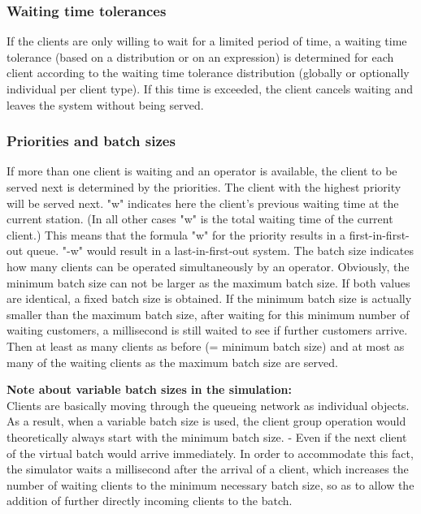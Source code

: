 \subsubsection*{Waiting time tolerances}

If the clients are only willing to wait for a limited period of time, a waiting time tolerance (based on a distribution
or on an expression) is determined for each client according to the waiting time tolerance distribution
(globally or optionally individual per client type). If this time is exceeded, the client cancels waiting and leaves
the system without being served.

\subsubsection*{Priorities and batch sizes}

If more than one client is waiting and an operator is available, the client to be served next is determined by the 
priorities. The client with the highest priority will be served next. 
"w" indicates here the client's previous waiting time at the current station. (In all other cases "w" is the total
waiting time of the current client.) This means that the formula "w" for the priority results
in a first-in-first-out queue. "-w" would result in a last-in-first-out system.
The batch size indicates how many clients can be operated simultaneously by an operator. Obviously, the minimum batch
size can not be larger as the maximum batch size. If both values are identical, a fixed batch size is obtained.
If the minimum batch size is actually smaller than the maximum batch size, after waiting for this minimum number of
waiting customers, a millisecond is still waited to see if further customers arrive. Then at least as many clients
as before (= minimum batch size) and at most as many of the waiting clients as the maximum batch size are served.

\textbf{Note about variable batch sizes in the simulation:}~\\
Clients are basically moving through the queueing network as individual objects.
As a result, when a variable batch size is used, the client group operation would theoretically always
start with the minimum batch size. - Even if the next client of the virtual batch would arrive immediately.
In order to accommodate this fact, the simulator waits a millisecond after the arrival of a client, which
increases the number of waiting clients to the minimum necessary batch size, so as to allow the addition
of further directly incoming clients to the batch.

